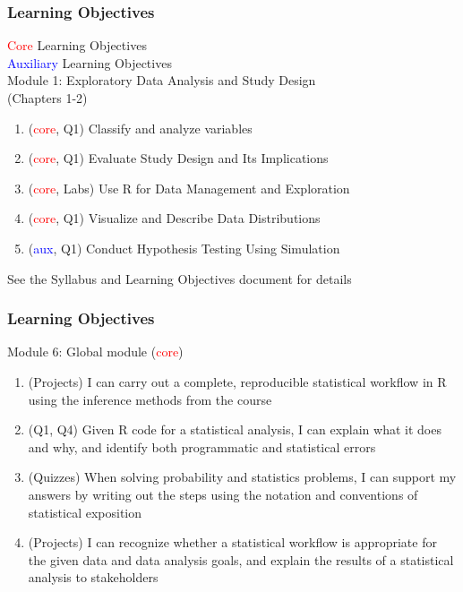 \documentclass[slidestop,compress,mathserif]{beamer}
\begin{document}

\begin{frame}
	\frametitle{Learning Objectives}

	\textcolor{red}{Core} Learning Objectives \\
	\textcolor{blue}{Auxiliary} Learning Objectives \\

	\vspace{10pt}
	Module 1: Exploratory Data Analysis and Study Design \\(Chapters 1-2)
	\begin{enumerate}
		\item (\textcolor{red}{core}, Q1) Classify and analyze variables 
		\item (\textcolor{red}{core}, Q1) Evaluate Study Design and Its Implications 
		\item (\textcolor{red}{core}, Labs) Use R for Data Management and Exploration
		\item (\textcolor{red}{core}, Q1) Visualize and Describe Data Distributions 
		\item (\textcolor{blue}{aux}, Q1) Conduct Hypothesis Testing Using Simulation 
	\end{enumerate}
	See the Syllabus and Learning Objectives document for details
\end{frame}

\begin{frame}
	\frametitle{Learning Objectives}
	Module 6: Global module (\textcolor{red}{core})
	\begin{enumerate}
		\item (Projects) I can carry out a complete, reproducible statistical workflow in R using the inference methods from the course  
		\item (Q1, Q4) Given R code for a statistical analysis, I can explain what it does and why, and identify both programmatic and statistical errors 
		\item (Quizzes) When solving probability and statistics problems, I can support my answers by writing out the steps using the notation and conventions of statistical exposition  
		\item (Projects) I can recognize whether a statistical workflow is appropriate for the given data and data analysis goals, and explain the results of a statistical analysis to stakeholders
	\end{enumerate}
\end{frame}
\end{document}
